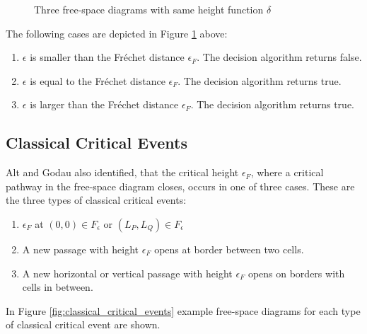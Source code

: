 \begin{figure}[H]
    \centering
    
    \qquad
    \qquad
	\caption{Three free-space diagrams with same height function $\delta$\protect\footnotemark}
    \label{fig:freespace_decision}
\end{figure}


The following cases are depicted in Figure \ref{fig:freespace_decision} above:
\begin{enumerate}[label=(\alph*)]
	\item $\epsilon$ is smaller than the Fréchet distance $\epsilon_F$. The decision algorithm returns false.
	\item $\epsilon$ is equal to the Fréchet distance $\epsilon_F$. The decision algorithm returns true.
	\item $\epsilon$ is larger than the Fréchet distance $\epsilon_F$. The decision algorithm returns true.
\end{enumerate}


\subsection{Classical Critical Events}

Alt and Godau also identified, that the critical height $\epsilon_F$, where a critical pathway in the free-space diagram closes, occurs in one of three cases. These are the three types of classical critical events:

\begin{enumerate}[label=(\alph*)]
	\item $\epsilon_F$ at $(0, 0) \in F_\epsilon$ or $(L_P, L_Q) \in F_\epsilon$
	\item A new passage with height $\epsilon_F$ opens at border between two cells.
	\item A new horizontal or vertical passage with height $\epsilon_F$ opens on borders with cells in between.
\end{enumerate}

In Figure \ref{fig:classical_critical_events} example free-space diagrams for each type of classical critical event are shown.

